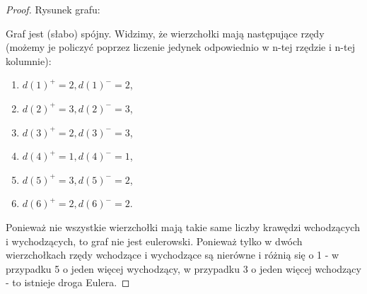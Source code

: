 \documentclass[11pt]{article}
\theoremstyle{definition}
\begin{document}
\begin{proof}
    Rysunek grafu:


    Graf jest (słabo) spójny. Widzimy, że wierzchołki mają następujące rzędy (możemy je policzyć poprzez liczenie jedynek odpowiednio w n-tej rzędzie i n-tej kolumnie):

    \begin{enumerate}
        \item $d(1)^+ = 2, d(1)^-=2$,
        \item $d(2)^+ = 3, d(2)^-=3$,
        \item $d(3)^+ = 2, d(3)^-=3$,
        \item $d(4)^+ = 1, d(4)^-=1$,
        \item $d(5)^+ = 3, d(5)^-=2$,
        \item $d(6)^+ = 2, d(6)^-=2$.
    \end{enumerate}

    Ponieważ nie wszystkie wierzchołki mają takie same liczby krawędzi wchodzących i wychodzących, to graf nie jest eulerowski. Ponieważ tylko w dwóch wierzchołkach rzędy wchodzące i wychodzące są nierówne i różnią się o 1 - w przypadku 5 o jeden więcej wychodzący, w przypadku 3 o jeden więcej wchodzący - to istnieje droga Eulera.

\end{proof}
\end{document}
